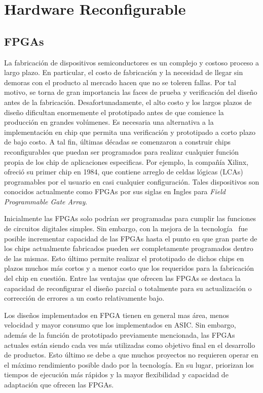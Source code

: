 \chapter{Hardware Reconfigurable}

\section{FPGAs}

La fabricación de dispositivos semiconductores es un complejo y
costoso proceso a largo plazo. En particular, el costo de fabricación
y la necesidad de llegar sin demoras con el producto al mercado hacen
que no se toleren fallas. Por tal motivo, se torna de gran importancia
las faces de prueba y verificación del diseño antes de la
fabricación. Desafortunadamente, el alto costo y los largos plazos de
diseño dificultan enormemente el prototipado antes de que comience la
producción en grandes volúmenes. Es necesaria una alternativa a la
implementación en chip que permita una verificación y prototipado a
corto plazo de bajo costo. A tal fin, últimas décadas se comenzaron a
construir chips reconfigurables que puedan ser programados para
realizar cualquier función propia de los chip de aplicaciones
especificas. Por ejemplo, la compañía Xilinx, ofreció su primer chip
en 1984, que contiene arreglo de celdas lógicas (LCAs) programables
por el usuario en casi cualquier configuración. Tales dispositivos son
conocidos actualmente como FPGAs por sus siglas en Ingles para
\textit{Field Programmable Gate Array}.

Inicialmente las FPGAs solo podrían ser programadas para cumplir las
funciones de circuitos digitales simples. Sin embargo, con la mejora
de la tecnología~\cite{Etiqueta02} fue posible incrementar capacidad
de las FPGAs hasta el punto en que gran parte de los chips actualmente
fabricados pueden ser completamente programados dentro de las
mismas. Esto último permite realizar el prototipado de dichos chips en
plazos muchos más cortos y a menor costo que los requeridos para la
fabricación del chip en cuestión. Entre las ventajas que ofrecen las
FPGAs se destaca la capacidad de reconfigurar el diseño parcial o
totalmente para su actualización o corrección de errores a un costo
relativamente bajo.

Los diseños implementados en FPGA tienen en general mas área, menos
velocidad y mayor consumo que los implementados en ASIC. Sin embargo,
además de la función de prototipado previamente mencionada, las FPGAs
actuales están siendo cada ves más utilizadas como objetivo final en
el desarrollo de productos. Esto último se debe a que muchos proyectos
no requieren operar en el máximo rendimiento posible dado por la
tecnología. En su lugar, priorizan los tiempos de ejecución más
rápidos y la mayor flexibilidad y capacidad de adaptación que ofrecen
las FPGAs.

